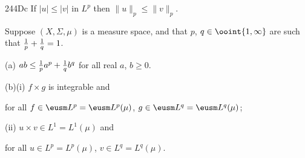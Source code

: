 \spheader 244Dc If $|u|\le |v|$ in $L^p$
then $\|u\|_p\le\|v\|_p$.

 Suppose $(X,\Sigma,\mu)$ is a measure space, and
that
$p$, $q\in\ooint{1,\infty}$ are such that ${1\over p}+{1\over q}=1$.

(a) $ab\le{1\over p}a^p+{1\over q}b^q$ for all real $a$, $b\ge 0$.

(b)(i) $f\times g$ is integrable and


\noindent for all $f\in \eusm L^p=\eusm L^p(\mu)$,
$g\in\eusm L^q=\eusm L^q(\mu)$;

\quad(ii) $u\times v\in L^1=L^1(\mu)$ and


\noindent for all $u\in L^p=L^p(\mu)$, $v\in L^q=L^q(\mu)$.


